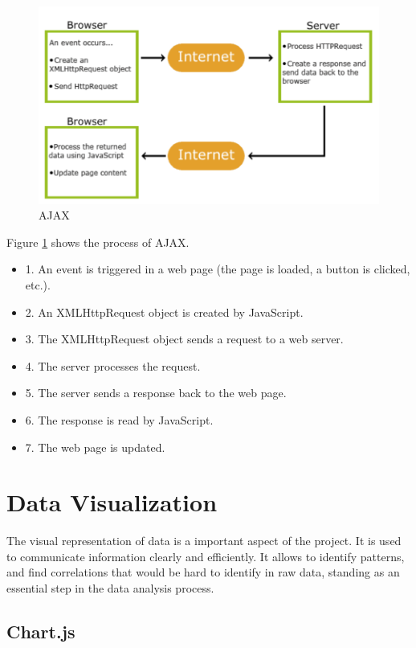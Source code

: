 \begin{figure}
    \centering
    \includegraphics[width=0.8\linewidth]{images/ajax.png}
    \caption{AJAX}
    \label{fig:ajax}
\end{figure}

Figure \ref{fig:ajax} shows the process of AJAX. 

\begin{itemize}
    \item 1. An event is triggered in a web page (the page is loaded, a button is clicked, etc.).
    \item 2. An XMLHttpRequest object is created by JavaScript.
    \item 3. The XMLHttpRequest object sends a request to a web server.
    \item 4. The server processes the request.
    \item 5. The server sends a response back to the web page.
    \item 6. The response is read by JavaScript.
    \item 7. The web page is updated.
\end{itemize}

\section{Data Visualization}

The visual representation of data is a important aspect of the project. It is used to communicate information clearly and efficiently. 
It allows to identify patterns, and find correlations that would be hard to identify in raw data, standing as an essential step in the data analysis process.

\subsection{Chart.js}

